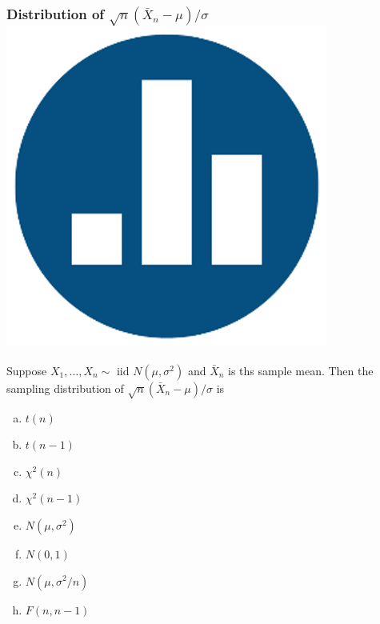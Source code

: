\documentclass[handout]{beamer}
\begin{document}
\begin{frame}[t]\frametitle{Distribution of $\sqrt{n}(\bar{X}_n - \mu)/\sigma$ \hfill \includegraphics[scale = 0.05]{./images/clicker}}
    
    Suppose $X_1, \hdots, X_n \sim \mbox{ iid } N(\mu, \sigma^2)$ and $\bar{X}_n$ is ths sample mean. Then the sampling distribution of \alert{$\sqrt{n}(\bar{X}_n - \mu)/\sigma$} is

    \begin{enumerate}[(a)]
    	\item $t(n)$
    	\item $t(n-1)$
    	\item $\chi^2(n)$
    	\item $\chi^2(n-1)$
    	\item $N(\mu, \sigma^2)$
    	\item $N(0,1)$
    	\item $N(\mu, \sigma^2/n)$
    	\item $F(n, n-1)$
    \end{enumerate}


\end{frame}
\end{document}
